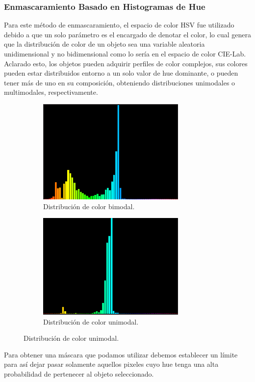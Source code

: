 \subsubsection{Enmascaramiento Basado en Histogramas de Hue}
Para este método de enmascaramiento, el espacio de color HSV fue utilizado debido a que un solo parámetro es el encargado de denotar el color, lo cual genera que la distribución de color de un objeto sea una variable aleatoria unidimensional y no bidimensional como lo sería en el espacio de color CIE-Lab. Aclarado esto, los objetos pueden adquirir perfiles de color complejos, sus colores pueden estar distribuidos entorno a un solo valor de hue dominante, o pueden tener más de uno en su composición, obteniendo distribuciones unimodales o multimodales, respectivamente. 
\begin{figure}[H]
	\centering
	\begin{subfigure}{.4\textwidth}
		\centering
		\includegraphics[width=0.8\textwidth]{Imagenes/camshift_hist_bimodal.PNG}
		\caption{Distribución de color bimodal.}
		\label{fig:bimodal}
	\end{subfigure}
	
	\begin{subfigure}{.4\textwidth}
		\centering
		\includegraphics[width=0.8\textwidth]{Imagenes/camshift_hist_unimodal.PNG}
		\caption{Distribución de color unimodal.}
		\label{fig:unimodal}
	\end{subfigure}

\end{figure}
Para obtener una máscara que podamos utilizar debemos establecer un límite para así dejar pasar solamente aquellos pixeles cuyo hue tenga una alta probabilidad de pertenecer al objeto seleccionado. 

